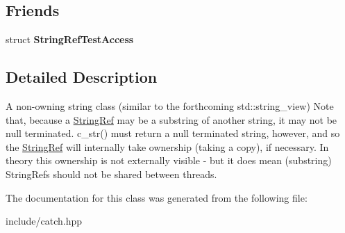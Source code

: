 \subsection*{Friends}
\begin{DoxyCompactItemize}
\item 
struct {\bfseries String\+Ref\+Test\+Access}\hypertarget{classCatch_1_1StringRef_a420e64e1652de1b0d427775781b018f5}{}\label{classCatch_1_1StringRef_a420e64e1652de1b0d427775781b018f5}

\end{DoxyCompactItemize}


\subsection{Detailed Description}
A non-\/owning string class (similar to the forthcoming std\+::string\+\_\+view) Note that, because a \hyperlink{classCatch_1_1StringRef}{String\+Ref} may be a substring of another string, it may not be null terminated. c\+\_\+str() must return a null terminated string, however, and so the \hyperlink{classCatch_1_1StringRef}{String\+Ref} will internally take ownership (taking a copy), if necessary. In theory this ownership is not externally visible -\/ but it does mean (substring) String\+Refs should not be shared between threads. 

The documentation for this class was generated from the following file\+:\begin{DoxyCompactItemize}
\item 
include/catch.\+hpp\end{DoxyCompactItemize}
